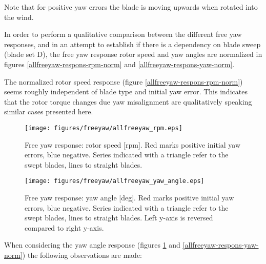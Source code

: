 \documentclass[a4paper]{jpconf}
\begin{document}
Note that for positive yaw errors the blade is moving upwards when rotated into the wind.

In order to perform a qualitative comparison between the different free yaw responses, and in an attempt to establish if there is a dependency on blade sweep (blade set D), the free yaw response rotor speed and yaw angles are normalized in figures \ref{allfreeyaw-respons-rpm-norm} and \ref{allfreeyaw-respons-yaw-norm}.

The normalized rotor speed response (figure \ref{allfreeyaw-respons-rpm-norm}) seems roughly independent of blade type and initial yaw error. This indicates that the rotor torque changes due yaw misalignment are qualitatively speaking similar cases presented here.

\begin{figure}[h]
\begin{minipage}{\textwidth}
\centering
\texttt{[image: figures/freeyaw/allfreeyaw\_rpm.eps]}
\caption{\label{allfreeyaw-respons-rpm} Free yaw response: rotor speed [rpm]. Red marks positive initial yaw errors, blue negative. Series indicated with a triangle refer to the swept blades, lines to straight blades.}
\end{minipage}
\begin{minipage}{\textwidth}
\centering
\texttt{[image: figures/freeyaw/allfreeyaw\_yaw\_angle.eps]}
\caption{\label{allfreeyaw-respons-yaw} Free yaw response: yaw angle [deg]. Red marks positive initial yaw errors, blue negative. Series indicated with a triangle refer to the swept blades, lines to straight blades. Left y-axis is reversed compared to right y-axis.}
\end{minipage} 
\end{figure}

When considering the yaw angle response (figures \ref{allfreeyaw-respons-yaw} and \ref{allfreeyaw-respons-yaw-norm}) the following observations are made:
\end{document}
